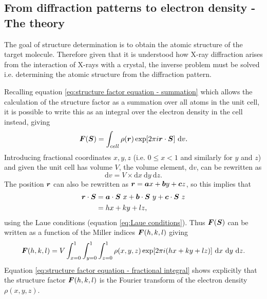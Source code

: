     \subsection{From diffraction patterns to electron density - The theory}
    \label{sub:From diffraction patterns to electron density - The theory}
        The goal of structure determination is to obtain the atomic structure of the target molecule.
        Therefore given that it is understood how X-ray diffraction arises from the interaction of X-rays with a crystal, the inverse problem must be solved i.e. determining the atomic structure from the diffraction pattern.

        Recalling equation \ref{eq:structure factor equation - summation} which allows the calculation of the structure factor as a summation over all atoms in the unit cell, it is possible to write this as an integral over the electron density in the cell instead, giving
        \begin{equation}
            \boldsymbol{F}(\boldsymbol{S}) = \int_{cell} \rho(\boldsymbol{r})\exp[2 \pi i \boldsymbol{r} \cdot \boldsymbol{S}]\ \mathrm{d}v.
            \label{eq:structure factor equation - integral}
        \end{equation}
        Introducing fractional coordinates $x, y, z$ (i.e. $0 \leq x < 1$ and similarly for $y$ and $z$) and given the unit cell has volume $V$, the volume element, $\mathrm{d}v$, can be rewritten as
        \begin{equation}
            \mathrm{d}v = V \times \mathrm{d}x\ \mathrm{d}y\ \mathrm{d}z.
        \end{equation}
        The position $\boldsymbol{r}$ can also be rewritten as $\boldsymbol{r} = \boldsymbol{a}x + \boldsymbol{b}y + \boldsymbol{c}z$, so this implies that
        \begin{align}
            \boldsymbol{r} \cdot \boldsymbol{S} &= \boldsymbol{a}\cdot\boldsymbol{S}\ x + \boldsymbol{b}\cdot\boldsymbol{S}\ y + \boldsymbol{c}\cdot\boldsymbol{S}\ z \\
            &= hx + ky + lz,
        \end{align}
        using the Laue conditions (equation \ref{eq:Laue conditions}). Thus $\boldsymbol{F}(\boldsymbol{S})$ can be written as a function of the Miller indices $\boldsymbol{F}(h,k,l)$ giving
        \begin{equation}
            \bs{F}(h,k,l) = V \int_{x=0}^1 \int_{y=0}^1 \int_{z=0}^1 \rho(x,y,z) \exp[2\pi i (hx + ky + lz)]\ \mathrm{d}x\ \mathrm{d}y\ \mathrm{d}z.
            \label{eq:structure factor equation - fractional integral}
        \end{equation}
        Equation \ref{eq:structure factor equation - fractional integral} shows explicitly that the structure factor $\boldsymbol{F}(h,k,l)$ is the Fourier transform of the electron density $\rho(x,y,z)$.
